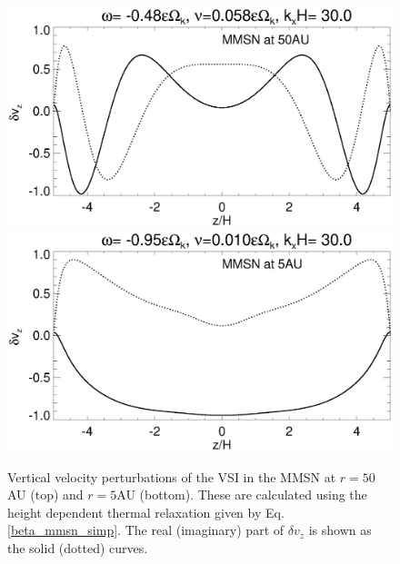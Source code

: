 





\begin{figure}
  \includegraphics[width=\linewidth,clip=true,trim=0cm 1.75cm 0cm
  0cm]{figures/eigenvectorvz_mmsn_50AU}
  \includegraphics[width=\linewidth,clip=true,trim=0cm 0.0cm 0cm
  0cm]{figures/eigenvectorvz_mmsn_5AU}
  \caption{Vertical velocity perturbations of the VSI in the MMSN at 
    $r=50$AU (top) and $r=5$AU (bottom). These are calculated using the height
    dependent thermal relaxation given by Eq. \ref{beta_mmsn_simp}. The real (imaginary) part of 
    $\delta v_z$ is shown as
    the solid (dotted) curves. %
    \label{mmsn_eigenvz}}
\end{figure}
